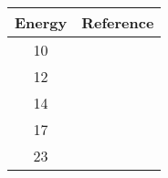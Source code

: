 \centering
\begin{tabular}{|c||c|} 
    \hline 
    \bf{Energy} & \bf{Reference} \\
    \hline
    \hline 
    10 & \cite{Anli1989}\\
    12 & \cite{Anli1989}\\
    14 & \cite{Anli1989}\\
    17 & \cite{Anli1989}\\
    23 & \cite{Lam1985}\\
    \hline
\end{tabular}
